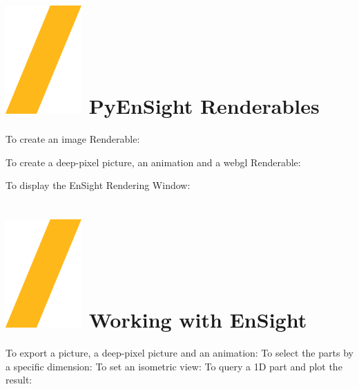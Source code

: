 \documentclass[9pt,landscape]{article}
\begin{document}
\begin{multicols}{3}


\section{\includegraphics[height=\fontcharht\font`\S]{slash.png} PyEnSight Renderables}

To create an image Renderable:



To create a deep-pixel picture, an animation and a webgl Renderable:

To display the EnSight Rendering Window:


\section{{\includegraphics[height=\fontcharht\font`\S]{slash.png}  Working with EnSight}}

To export a picture, a deep-pixel picture and an animation:
To select the parts by a specific dimension:
To set an isometric view: 
To query a 1D part and plot the result:



\end{multicols}
\end{document}
